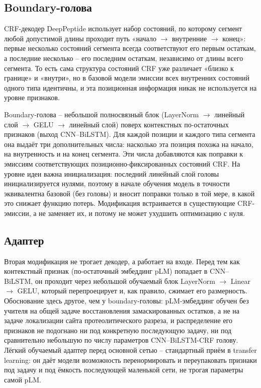\documentclass{article}
\begin{document}
\subsection{Boundary-голова}

CRF-декодер DeepPeptide использует набор состояний, по которому сегмент любой допустимой длины проходит путь «начало $\to$ внутренние $\to$ конец»: первые несколько состояний сегмента всегда соответствуют его первым остаткам, а последние несколько -- его последним остаткам, независимо от длины всего сегмента. То есть сама структура состояний CRF уже различает «близко к границе» и «внутри», но в базовой модели эмиссии всех внутренних состояний одного типа идентичны, и эта позиционная информация никак не используется на уровне признаков.

Boundary-голова -- небольшой полносвязный блок (LayerNorm $\to$ линейный слой $\to$ GELU $\to$ линейный слой) поверх контекстных по-остаточных признаков (выход CNN--BiLSTM). Для каждой позиции и каждого типа сегмента она выдаёт три дополнительных числа: насколько эта позиция похожа на начало, на внутренность и на конец сегмента. Эти числа добавляются как поправки к эмиссиям соответствующих позиционно-фиксированных состояний CRF. На уровне идеи важна инициализация: последний линейный слой головы инициализируется нулями, поэтому в начале обучения модель в точности эквивалентна базовой (без головы) и вносит поправки только в той мере, в какой это снижает функцию потерь. Модификация встраивается в существующие CRF-эмиссии, а не заменяет их, и потому не может ухудшить оптимизацию с нуля.

\subsection{Адаптер}

Вторая модификация не трогает декодер, а работает на входе. Перед тем как контекстный признак (по-остаточный эмбеддинг pLM) попадает в CNN--BiLSTM, он проходит через небольшой обучаемый блок LayerNorm $\to$ Linear $\to$ GELU, который перепроецирует и, как правило, сжимает его размерность. Обоснование здесь другое, чем у boundary-головы: pLM-эмбеддинг обучен без учителя на общей задаче восстановления замаскированных остатков, а не на задаче локализации сайта протеолитического разреза, и распределение его признаков не подогнано ни под конкретную последующую задачу, ни под сравнительно небольшую по числу параметров CNN--BiLSTM-CRF голову. Лёгкий обучаемый адаптер перед основной сетью -- стандартный приём в transfer learning: он даёт модели возможность перенормировать и переупаковать признаки под задачу и под ёмкость последующей маленькой сети, не трогая параметры самой pLM.
\end{document}
